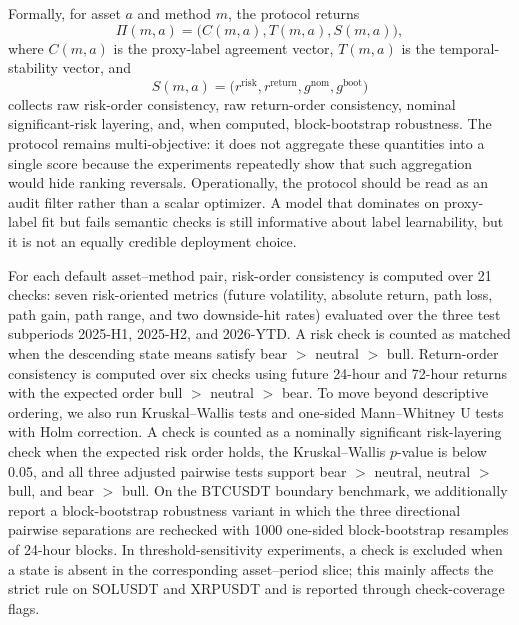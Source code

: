 \documentclass[a4paper,fleqn]{cas-dc}
\begin{document}
Formally, for asset $a$ and method $m$, the protocol returns
\[
\Pi(m,a)=\big(C(m,a),T(m,a),S(m,a)\big),
\]
where $C(m,a)$ is the proxy-label agreement vector, $T(m,a)$ is the temporal-stability vector, and
\[
S(m,a)=\big(r^{\mathrm{risk}},r^{\mathrm{return}},g^{\mathrm{nom}},g^{\mathrm{boot}}\big)
\]
collects raw risk-order consistency, raw return-order consistency, nominal significant-risk layering, and, when computed, block-bootstrap robustness. The protocol remains multi-objective: it does not aggregate these quantities into a single score because the experiments repeatedly show that such aggregation would hide ranking reversals. Operationally, the protocol should be read as an audit filter rather than a scalar optimizer. A model that dominates on proxy-label fit but fails semantic checks is still informative about label learnability, but it is not an equally credible deployment choice.

For each default asset--method pair, risk-order consistency is computed over 21 checks: seven risk-oriented metrics (future volatility, absolute return, path loss, path gain, path range, and two downside-hit rates) evaluated over the three test subperiods 2025-H1, 2025-H2, and 2026-YTD. A risk check is counted as matched when the descending state means satisfy bear $>$ neutral $>$ bull. Return-order consistency is computed over six checks using future 24-hour and 72-hour returns with the expected order bull $>$ neutral $>$ bear. To move beyond descriptive ordering, we also run Kruskal--Wallis tests and one-sided Mann--Whitney U tests with Holm correction. A check is counted as a nominally significant risk-layering check when the expected risk order holds, the Kruskal--Wallis $p$-value is below 0.05, and all three adjusted pairwise tests support bear $>$ neutral, neutral $>$ bull, and bear $>$ bull. On the BTCUSDT boundary benchmark, we additionally report a block-bootstrap robustness variant in which the three directional pairwise separations are rechecked with 1000 one-sided block-bootstrap resamples of 24-hour blocks. In threshold-sensitivity experiments, a check is excluded when a state is absent in the corresponding asset--period slice; this mainly affects the strict rule on SOLUSDT and XRPUSDT and is reported through check-coverage flags.
\end{document}
